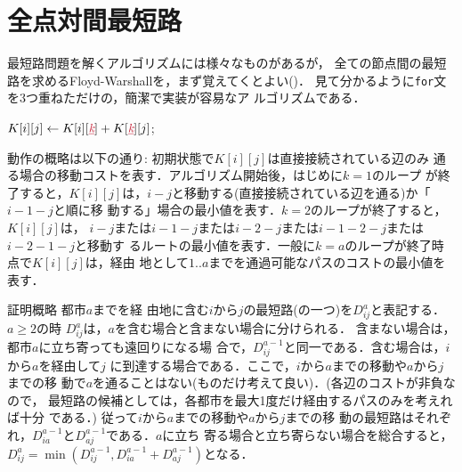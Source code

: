 \section{全点対間最短路}

最短路問題を解くアルゴリズムには様々なものがあるが，
全ての節点間の最短路を求めるFloyd-Warshallを，まず覚えてくとよい(\pccbook[p.~97])．
見て分かるように\texttt{for}文を3つ重ねただけの，簡潔で実装が容易なア
ルゴリズムである．

\begin{algorithmic}[1]
\Statex
{}
\Statex
{}
\label{alg:floyd:relax}
\State $K[i][j] \gets K[i][\cemph{k}]+K[\cemph{k}][j]$;\label{alg:floyd:relax2}
\EndIf
\EndFor
\EndFor
\EndFor
\EndProcedure
\end{algorithmic}

動作の概略は以下の通り: 初期状態で$K[i][j]$は直接接続されている辺のみ
通る場合の移動コストを表す．アルゴリズム開始後，はじめに$k=1$のループ
が終了すると，$K[i][j]$は，$i-j$と移動する(直接接続されている辺を通る)か「$i-1-j$と順に移
動する」場合の最小値を表す．$k=2$のループが終了すると，$K[i][j]$は，
$i-j$または$i-1-j$または$i-2-j$または$i-1-2-j$または$i-2-1-j$と移動す
るルートの最小値を表す．一般に$k=a$のループが終了時点で$K[i][j]$は，経由
地として$1..a$までを通過可能なパスのコストの最小値を表す．

\begin{itembox}[l]{証明概略}
都市$a$までを経
由地に含む$i$から$j$の最短路(の一つ)を$D^a_{ij}$と表記する．$a\ge 2$の時
$D^a_{ij}$は，$a$を含む場合と含まない場合に分けられる．
含まない場合は，都市$a$に立ち寄っても遠回りになる場
合で，$D^{a-1}_{ij}$と同一である．含む場合は，$i$から$a$を経由して$j$
に到達する場合である．ここで，$i$から$a$までの移動や$a$から$j$までの移
動で$a$を通ることはない(ものだけ考えて良い)．(各辺のコストが非負なので，
最短路の候補としては，各都市を最大1度だけ経由するパスのみを考えれば十分
である．) 従って$i$から$a$までの移動や$a$から$j$までの移
動の最短路はそれぞれ，$D^{a-1}_{ia}$と$D^{a-1}_{aj}$である．$a$に立ち
寄る場合と立ち寄らない場合を総合すると，$D^a_{ij}=\min(D^{a-1}_{ij}, D^{a-1}_{ia}+D^{a-1}_{aj})$となる．
\end{itembox}

